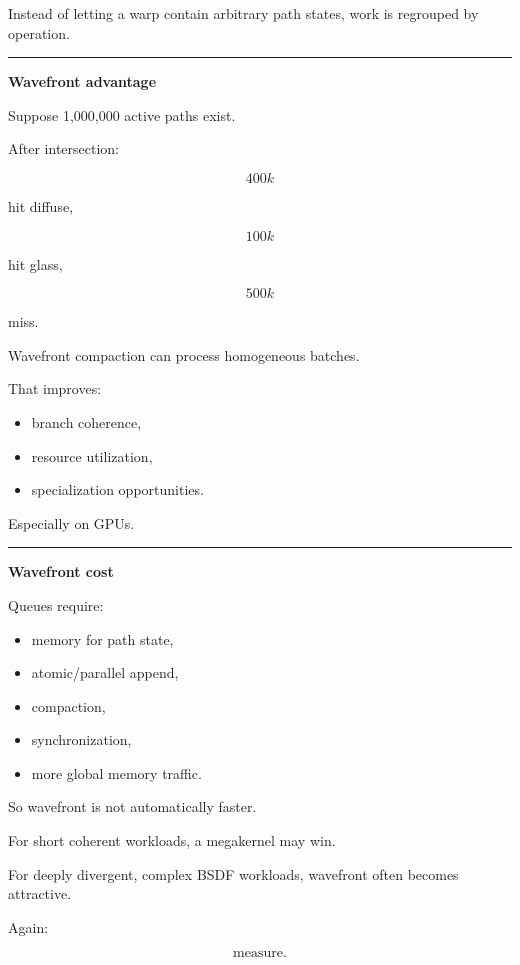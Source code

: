 Instead of letting a warp contain arbitrary path states, work is regrouped by operation.

\begin{center}\rule{0.5\linewidth}{0.5pt}\end{center}

\textbf{Wavefront advantage}

Suppose 1,000,000 active paths exist.

After intersection:

\[
400k
\]

hit diffuse,

\[
100k
\]

hit glass,

\[
500k
\]

miss.

Wavefront compaction can process homogeneous batches.

That improves:

\begin{itemize}
\tightlist
\item
  branch coherence,
\item
  resource utilization,
\item
  specialization opportunities.
\end{itemize}

Especially on GPUs.

\begin{center}\rule{0.5\linewidth}{0.5pt}\end{center}

\textbf{Wavefront cost}

Queues require:

\begin{itemize}
\tightlist
\item
  memory for path state,
\item
  atomic/parallel append,
\item
  compaction,
\item
  synchronization,
\item
  more global memory traffic.
\end{itemize}

So wavefront is not automatically faster.

For short coherent workloads, a megakernel may win.

For deeply divergent, complex BSDF workloads, wavefront often becomes attractive.

Again:

\[
\boxed{\text{measure}.}
\]

